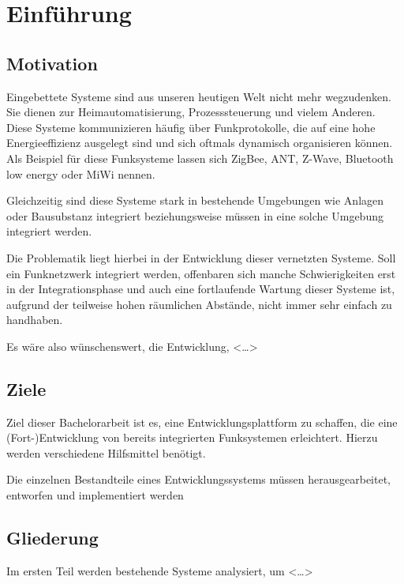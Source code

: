 \chapter{Einführung}
\adjustmtc
\minitoc
\section{Motivation}
Eingebettete Systeme sind aus unseren heutigen Welt nicht mehr wegzudenken. Sie
dienen zur Heimautomatisierung, Prozesssteuerung und vielem
Anderen. Diese Systeme kommunizieren
häufig über Funkprotokolle, die auf eine hohe Energieeffizienz ausgelegt sind
und sich oftmals dynamisch organisieren können. Als Beispiel für diese
Funksysteme lassen sich ZigBee, ANT, Z-Wave, Bluetooth low energy oder MiWi
nennen.

Gleichzeitig sind diese Systeme stark in bestehende Umgebungen wie Anlagen oder
Bausubstanz integriert beziehungsweise müssen in eine solche Umgebung
integriert werden.

Die Problematik liegt hierbei in der Entwicklung dieser vernetzten Systeme. Soll
ein Funknetzwerk integriert werden, offenbaren sich manche Schwierigkeiten erst
in der Integrationsphase und auch eine fortlaufende Wartung dieser Systeme ist,
aufgrund der teilweise hohen räumlichen Abstände, nicht immer sehr einfach zu
handhaben.

Es wäre also wünschenswert, die Entwicklung,  <\ldots>

\section{Ziele}
Ziel dieser Bachelorarbeit ist es, eine Entwicklungsplattform zu schaffen, die
eine\\ (Fort-)Entwicklung von bereits integrierten Funksystemen
erleichtert.
Hierzu werden verschiedene Hilfsmittel benötigt.

Die einzelnen Bestandteile eines Entwicklungssystems müssen herausgearbeitet,
entworfen und implementiert werden

\section{Gliederung}
Im ersten Teil werden bestehende Systeme analysiert, um <\ldots>
